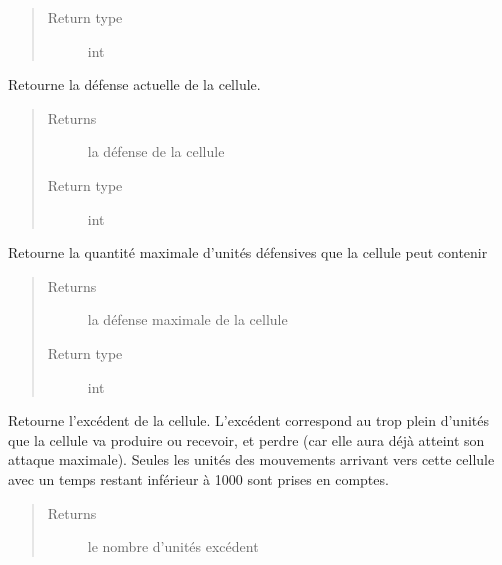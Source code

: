 \documentclass[letterpaper,10pt,english]{sphinxmanual}
\begin{document}
\begin{fulllineitems}
\begin{fulllineitems}
\begin{quote}
\begin{description}
\item[{Return type}] \leavevmode
int

\end{description}\end{quote}

\end{fulllineitems}


\begin{fulllineitems}
\label{index:Cellule.Cellule.getDefense}
Retourne la défense actuelle de la cellule.
\begin{quote}\begin{description}
\item[{Returns}] \leavevmode
la défense de la cellule

\item[{Return type}] \leavevmode
int

\end{description}\end{quote}

\end{fulllineitems}


\begin{fulllineitems}
\label{index:Cellule.Cellule.getDefenseMax}
Retourne la quantité maximale d'unités défensives que la cellule peut contenir
\begin{quote}\begin{description}
\item[{Returns}] \leavevmode
la défense maximale de la cellule

\item[{Return type}] \leavevmode
int

\end{description}\end{quote}

\end{fulllineitems}


\begin{fulllineitems}
\label{index:Cellule.Cellule.getExcedent}
Retourne l'excédent de la cellule. 
L'excédent correspond au trop plein d'unités que la cellule va produire ou recevoir, et perdre (car elle aura déjà atteint son attaque maximale).
Seules les unités des mouvements arrivant vers cette cellule avec un temps restant inférieur à 1000 sont prises en comptes.
\begin{quote}\begin{description}
\item[{Returns}] \leavevmode
le nombre d'unités excédent


\end{description}
\end{quote}
\end{fulllineitems}
\end{fulllineitems}
\end{document}
